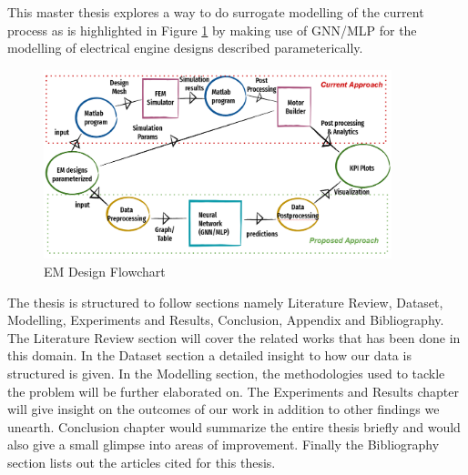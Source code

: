 \documentclass{report} %
\begin{document}

This master thesis explores a way to do surrogate modelling of the current process as is highlighted in Figure \ref{fig:EM Design Flowchart} by making use of GNN/MLP for the modelling of electrical engine designs described parameterically. \\
\begin{figure}[h]
    \centering
    \includegraphics[width=0.9\textwidth]{./ReportImages/EM_design_flowchart_v2.png} 
    \caption{EM Design Flowchart}
    \label{fig:EM Design Flowchart}
\end{figure}

The thesis is structured to follow sections namely Literature Review, Dataset, Modelling, Experiments and Results, Conclusion, Appendix and Bibliography.\\
The Literature Review section will cover the related works that has been done in this domain. In the Dataset section a detailed insight to how our data is structured is given.
In the Modelling section, the methodologies used to tackle the problem will be further elaborated on. The Experiments and Results chapter will give insight on the outcomes of our work in addition to other findings we unearth. 
Conclusion chapter would summarize the entire thesis briefly and would also give a small glimpse into areas of improvement. Finally the Bibliography section lists out the articles cited for this thesis.\\
\newpage 
\end{document}
